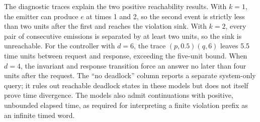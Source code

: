 The diagnostic traces explain the two positive reachability results. With
$k=1$, the emitter can produce $e$ at times 1 and 2, so the second event is
strictly less than two units after the first and reaches the violation sink.
With $k=2$, every pair of consecutive emissions is separated by at least two
units, so the sink is unreachable. For the controller with $d=6$, the trace
$(p,0.5)(q,6)$ leaves 5.5 time units between request and response, exceeding
the five-unit bound. When $d=4$, the invariant and response transition force
an answer no later than four units after the request. The ``no deadlock''
column reports a separate system-only query; it rules out reachable deadlock
states in these models but does not itself prove time divergence. The models
also admit continuations with positive, unbounded elapsed time, as required
for interpreting a finite violation prefix as an infinite timed word.
